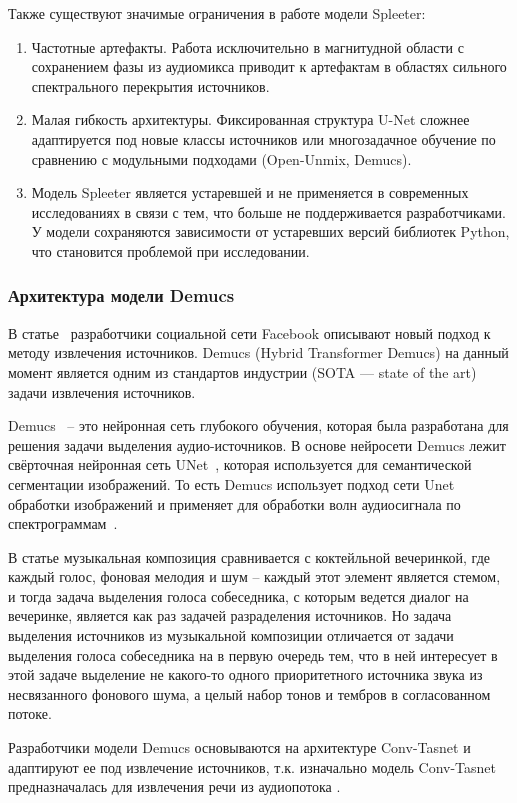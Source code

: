 \documentclass[14pt]{extarticle}
\begin{document}
Также существуют значимые ограничения в работе модели Spleeter:
\begin{enumerate}[label=\arabic*)]
	\item Частотные артефакты. Работа исключительно в магнитудной области с сохранением фазы из 
	аудиомикса приводит к артефактам в областях сильного спектрального перекрытия источников.
	\item Малая гибкость архитектуры. Фиксированная структура U-Net сложнее адаптируется под новые 
	классы источников или многозадачное обучение по сравнению с модульными подходами (Open-Unmix, Demucs).
	\item Модель Spleeter является устаревшей и не применяется в современных исследованиях в связи с тем, что больше не поддерживается разработчиками.
	У модели сохраняются зависимости от устаревших версий библиотек Python, что становится проблемой при исследовании.
\end{enumerate}

\subsubsection{Архитектура модели Demucs}

\par В статье~\cite{demucs} разработчики социальной сети Facebook описывают новый подход к методу извлечения источников. 
Demucs (Hybrid Transformer Demucs) на данный момент является одним из стандартов индустрии (SOTA --- state of the art) 
задачи извлечения источников.
\par Demucs~\cite{demucs} – это нейронная сеть глубокого обучения, которая была разработана для решения задачи 
выделения аудио-источников. В основе нейросети Demucs лежит свёрточная нейронная сеть UNet~\cite{unet}, 
которая используется для семантической сегментации изображений. То есть Demucs использует подход 
сети Unet обработки изображений и применяет для обработки волн аудиосигнала по спектрограммам~\cite{demucs}.
\par В статье музыкальная композиция сравнивается с коктейльной вечеринкой, где каждый голос, 
фоновая мелодия и шум – каждый этот элемент является стемом, и тогда задача выделения голоса собеседника,
 с которым ведется диалог на вечеринке, является как раз задачей разраделения источников. 
 Но задача выделения источников из музыкальной композиции отличается от задачи выделения голоса собеседника 
 на в первую очередь тем, что в ней интересует в этой задаче выделение не 
 какого-то одного приоритетного источника звука из несвязанного фонового шума, а целый набор тонов и 
 тембров в согласованном потоке.
\par Разработчики модели Demucs основываются на архитектуре Conv-Tasnet и адаптируют ее под извлечение 
источников, т.к. изначально модель Conv-Tasnet предназначалась для извлечения речи из аудиопотока \cite{Conv-TasNet}.
\end{document}
